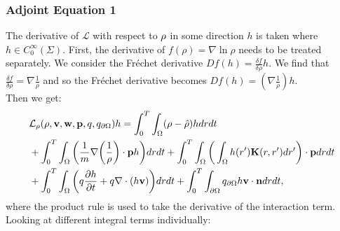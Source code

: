 \subsubsection{Adjoint Equation 1}

The derivative of $\mathcal{L}$ with respect to $\rho$ in some direction $h$ is taken where ${h} \in C_0^\infty(\Sigma) $.
First, the derivative of $f(\rho) = \nabla \ln \rho $ needs to be treated separately. We consider the Fr\'echet derivative $Df(h) = \frac{\delta f}{\delta \rho}h$. We find that $\frac{\delta f}{\delta \rho} = \nabla \frac{1}{\rho}$ and so the Fr\'echet derivative becomes $Df(h) = \left(\nabla \frac{1}{\rho}\right)h$. \\
Then we get:
\begin{align*}
&\mathcal{L}_\rho(\rho,\mathbf{v},\mathbf{w},\mathbf{p},q,{q}_{\partial \Omega})h = \int_0^T \int_\Omega  (\rho - \hat {\rho})h drdt \\
&+ \int_0^T \int_\Omega \bigg( \frac{1}{m}\nabla \bigg(\frac{1}{\rho}\bigg)\cdot \mathbf{p} h\bigg)  dr dt + \int_0^T \int_\Omega \bigg(\int_\Omega h(r') \mathbf{K}(r,r') dr'\bigg) \cdot \mathbf{p} dr dt\\
& + \int_0^T \int_\Omega \bigg(q\frac{\partial h}{\partial t} + q\nabla \cdot (h \mathbf{v})\bigg)  dr dt +\int_0^T \int_{\partial\Omega} {q}_{\partial \Omega} h\mathbf{v} \cdot \mathbf{n}  dr dt,
\end{align*}
where the product rule is used to take the derivative of the interaction term.
Looking at different integral terms individually:

